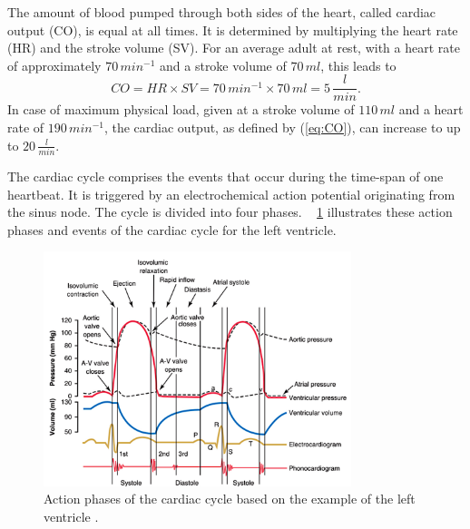  The amount of blood pumped through both sides of the heart,  called cardiac output (CO), is equal at all times. It is determined by multiplying the heart rate (HR) and the stroke volume (SV). For an average adult at rest, with a heart rate of approximately $70\, min^{-1}$ and a stroke volume of $70 \, ml$, this leads to
 \begin{equation}
   CO = HR \times SV = 70\, min^{-1} \times 70 \,ml = 5 \,\frac{l}{min}.
  \label{eq:CO}
 \end{equation}
In case of maximum physical load, given at a stroke volume of $110\,ml$ and a heart rate of $190 \, min^{-1}$,  the cardiac output, as defined by (\ref{eq:CO}), can increase to up to $20\,\frac{l}{min}$. \cite{HKS4}

The cardiac cycle comprises the events that occur during the time-span of one heartbeat. It is triggered by an electrochemical action potential originating from the sinus node. The cycle is divided into four phases. \figurename~ \ref{fig:cardiac_cycle} illustrates these action phases and events of the cardiac cycle for the left ventricle.
\begin{figure}[h]
  \centering
  \includegraphics[width=0.8\textwidth]{images/cardiac_cycle.jpg}
  \caption[Action phases of left ventricular cardiac cycle \cite{GH20}]{Action phases of the cardiac cycle based on the example of the left ventricle \cite{GH20}.}
  \label{fig:cardiac_cycle}
\end{figure}
